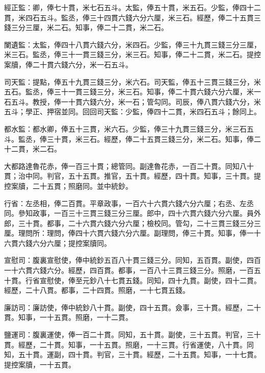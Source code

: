 \begin{pinyinscope}
 經正監：卿，俸七十貫，米七石五斗。太監，俸五十貫，米五石。少監，俸四十二貫，米四石五斗。監丞，俸三十四貫六錢六分六厘，米三石。經歷，俸二十五貫三錢三分三厘，米二石。知事，俸二十二貫，米二石。



 闌遺監：太監，俸四十八貫六錢六分，米四石。少監，俸三十九貫三錢三分三厘，米三石。監丞，俸三十一貫三錢三分，米三石。知事，俸二十二貫，米二石。提控案牘，俸二十貫六錢六分，米一石五斗。



 司天監：提點，俸五十九貫三錢三分，米六石。司天監，俸五十三貫三錢三分，米五石。監丞，俸三十一貫三錢三分，米三石。知事，俸二十貫六錢六分六厘，米一石五斗。教授，俸一十貫六錢六分，米一石；管勾同。司辰，俸八貫六錢六分，米五斗；學正、押宿並同。回回司天監：少監，俸四十二貫，米四石五斗；餘同上。



 都水監：都水卿，俸五十三貫，米六石。少監，俸三十九貫三錢三分，米三石五斗。監丞，俸三十貫，米三石。經歷，俸二十五貫三錢三分，米二石。知事，俸二十二貫，米二石。



 大都路達魯花赤，俸一百三十貫；總管同。副達魯花赤，一百二十貫。同知八十貫；治中同。判官，五十五貫。推官，五十貫。經歷，四十貫。知事，三十貫。提控案牘，二十五貫；照磨同。並中統鈔。



 行省：左丞相，俸二百貫。平章政事，一百六十六貫六錢六分六厘；右丞、左丞同。參知政事，一百三十三貫三錢三分三厘。郎中，四十六貫六錢六分六厘。員外郎，三十貫。都事，二十六貫六錢六分六厘；檢校同。管勾，二十三貫三錢三分三厘。理問所：理問，俸四十六貫六錢六分六厘。副理問，俸三十貫。知事，俸一十六貫六錢六分六厘；提控案牘同。



 宣慰司：腹裏宣慰使，俸中統鈔五百八十貫三錢三分。同知，五百貫。副使，四百一十六貫六錢六分。經歷，四百貫。都事，一百八十三貫三錢三分。照磨，一百五十貫。行省宣慰使，俸至元鈔八十七貫五錢。同知，四十九貫。副使，四十二貫。經歷，二十八貫。都事，二十四貫。照磨，一十七貫五錢。



 廉訪司：廉訪使，俸中統鈔八十貫。副使，四十五貫。僉事，三十貫。經歷，二十貫。知事，一十五貫。照磨，一十二貫。



 鹽運司：腹裏運使，俸一百二十貫。同知，五十貫。副使，三十五貫。判官，三十貫。經歷，二十貫。知事，一十五貫。照磨，一十三貫。行省運使，八十貫。同知，五十貫。運副，四十貫。判官，三十貫。經歷，二十五貫。知事，一十七貫。提控案牘，一十五貫。




\end{pinyinscope}
